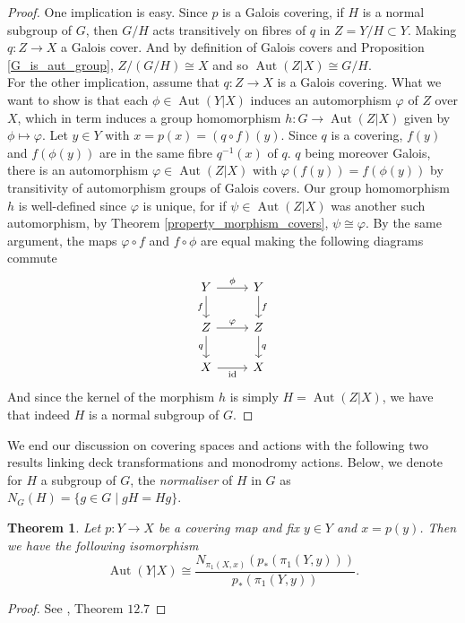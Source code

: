 \documentclass{article}
\theoremstyle{plain}
\newtheorem{theorem}{Theorem}[subsection]
\theoremstyle{definition}
\DeclareMathOperator{\Aut}{Aut}
\DeclareMathOperator{\id}{id}
\begin{document}
\begin{proof}
    One implication is easy. Since $p$ is a Galois covering, if $H$ is a normal subgroup of $G$, then $G/H$ acts transitively on fibres of $q$ in $Z=Y/H\subset Y$. 
    Making $q:Z\rightarrow X$ a Galois cover. 
    And by definition of Galois covers and Proposition \ref{G_is_aut_group}, $Z/(G/H) \cong X$ and so $\Aut(Z|X)\cong G/H$.\\
    For the other implication, assume that $q:Z\rightarrow X$ is a Galois covering.
    What we want to show is that each $\phi\in \Aut(Y|X)$ induces an automorphism $\varphi$ of $Z$ over $X$, which in term induces a group homomorphism $h : G \rightarrow \Aut(Z|X)$ given by $\phi\mapsto\varphi$. 
    Let $y\in Y$ with $x = p(x)= (q\circ f)(y)$. Since $q$ is a covering, $f(y)$ and $f(\phi(y))$ are in the same fibre $q^{-1}(x)$ of $q$.
    $q$ being moreover Galois, there is an automorphism $\varphi\in\Aut(Z|X)$ with $\varphi(f(y))=f(\phi(y))$ by transitivity of automorphism groups of Galois covers.
    Our group homomorphism $h$ is well-defined since $\varphi$ is unique, for if $\psi\in\Aut(Z|X)$ was another such automorphism, by Theorem \ref{property_morphism_covers}, $\psi\cong\varphi$.
    By the same argument, the maps $\varphi\circ f$ and $f\circ \phi$ are equal making the following diagrams commute
    \[
    \begin{tikzcd}
        Y \arrow[r,"\phi"] \arrow[d, "f"'] & Y \arrow[d,"f"] \\
        Z \arrow[r,"\varphi"] \arrow[d,"q"'] & Z \arrow[d,"q"]\\
        X \arrow[r, "\id"'] & X
    \end{tikzcd}
    \]
    And since the kernel of the morphism $h$ is simply $H = \Aut(Z|X)$, we have that indeed $H$ is a normal subgroup of $G$.
\end{proof}





\noindent We end our discussion on covering spaces and actions with the following two results linking deck transformations and monodromy actions. 
Below, we denote for $H$ a subgroup of $G$, the \textit{normaliser} of $H$ in $G$ as $N_G(H) = \{g\in G\mid gH=Hg\}$.
\begin{theorem}
\label{th_link_aut_fund}
Let $p:Y\rightarrow X$ be a covering map and fix $y\in Y$ and $x = p(y)$. Then we have the following isomorphism
    $$\Aut(Y|X) \cong \frac{N_{\pi_1(X,x)}(p_*(\pi_1(Y,y)))}{p_*(\pi_1(Y,y))}  .$$
\end{theorem}
\begin{proof}
    See \cite{Intro_manifolds}, Theorem $12.7$
\end{proof}
\end{document}

